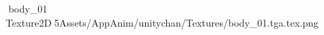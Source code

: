    body_01             	   Texture2D   5   Assets/AppAnim/unitychan/Textures/body_01.tga.tex.png
